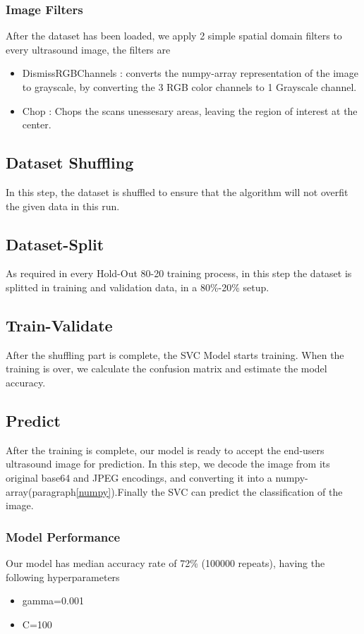			\subsubsection{Image Filters}
				After the dataset has been loaded, we apply 2 simple spatial domain filters to every ultrasound image, the filters are
				\begin{itemize}
					\item DismissRGBChannels : converts the numpy-array representation of the image to grayscale, by converting the 
					3 RGB color channels to 1 Grayscale channel.
					\item Chop : Chops the scans unessesary areas, leaving the region of interest at the center.
				\end{itemize}
			\subsection{Dataset Shuffling}
				In this step, the dataset is shuffled to ensure that the algorithm will not overfit the given data in this run.
			\subsection{Dataset-Split}
				As required in every Hold-Out 80-20 training process, in this step the dataset is splitted in training and validation data,
				in a 80\%-20\% setup.
			\subsection{Train-Validate}
				After the shuffling part is complete, the SVC Model starts training. When the training is over, we calculate the confusion matrix
				and estimate the model accuracy.
			\subsection{Predict}
				After the training is complete, our model is ready to accept the end-users ultrasound image for prediction. In this step, we
				decode the image from its original base64 and JPEG encodings, and converting it into a numpy-array(paragraph\ref{numpy}).Finally
				the SVC can predict the classification of the image.
			\subsubsection{Model Performance}
				Our model has median accuracy rate of 72\% (100000 repeats), having the following hyperparameters
				\begin{itemize}
					\item gamma=0.001
					\item C=100
				\end{itemize}
